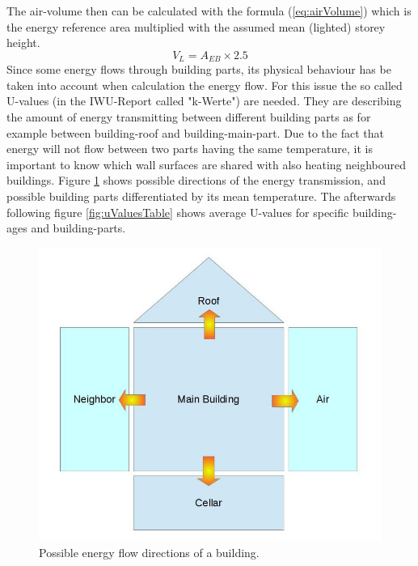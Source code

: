 The air-volume then can be calculated with the formula (\ref{eq:airVolume}) which is the energy reference area multiplied with the assumed mean (lighted) storey height.
\begin{equation}
	V_L = A_{EB} \times 2.5
	\label{eq:airVolume}
\end{equation}
Since some energy flows through building parts, its physical behaviour has be taken into account when calculation the energy flow. For this issue the so called U-values (in the IWU-Report called "k-Werte") are needed. They are describing the amount of energy transmitting between different building parts as for example between building-roof and building-main-part. Due to the fact that energy will not flow between two parts having the same temperature, it is important to know which wall surfaces are shared with also heating neighboured buildings. Figure \ref{fig:uValues} shows possible directions of the energy transmission, and possible building parts differentiated by its mean temperature. The afterwards following figure \ref{fig:uValuesTable} shows average U-values for specific building-ages and building-parts.
\begin{figure}[h]
	\centering
 	 \includegraphics[scale=0.4]{phase2/group1/U-Values.jpg}
	\caption{Possible energy flow directions of a building.}
	\label{fig:uValues}
\end{figure}
